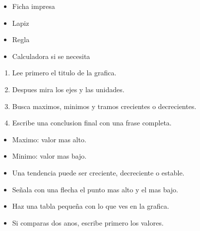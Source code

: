 \documentclass[12pt,a4paper]{article}
\begin{document}
        \FichaCabecera

        \begin{materialesbox}
        \begin{itemize}
    \item Ficha impresa
    \item Lapiz
    \item Regla
    \item Calculadora si se necesita
\end{itemize}
        \end{materialesbox}

        \begin{pasosbox}
        \begin{enumerate}
    \item Lee primero el titulo de la grafica.
    \item Despues mira los ejes y las unidades.
    \item Busca maximos, minimos y tramos crecientes o decrecientes.
    \item Escribe una conclusion final con una frase completa.
\end{enumerate}
        \end{pasosbox}

        \begin{recordatoriobox}
        \begin{itemize}
    \item Maximo: valor mas alto.
    \item Minimo: valor mas bajo.
    \item Una tendencia puede ser creciente, decreciente o estable.
\end{itemize}
        \end{recordatoriobox}

        \begin{apoyobox}
        \begin{itemize}
    \item Señala con una flecha el punto mas alto y el mas bajo.
    \item Haz una tabla pequeña con lo que ves en la grafica.
    \item Si comparas dos anos, escribe primero los valores.
\end{itemize}
        \end{apoyobox}


\end{document}
